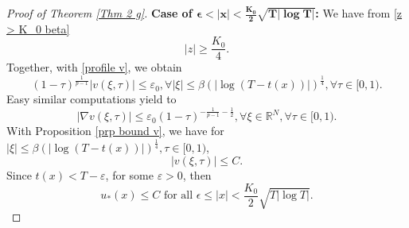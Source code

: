 \documentclass[11pt,a4paper]{article}
\newcommand{\1}{\mathbbm{1}}
\numberwithin{equation}{section}
\newcommand{\numberset}{\mathbb}
\newcommand{\R}{\numberset{R}}
\theoremstyle{remark}
\begin{document}
\begin{proof}[Proof of Theorem \ref{Thm 2 g}]
\textbf{Case of $\mathbf{\epsilon < |x|<\frac{K_0}{2}\sqrt{T|\log T|}}$:} We have from \eqref{z > K_0 beta}
$$|z|\geq \frac{K_0}{4}.$$
Together, with \eqref{profile v}, we obtain \begin{equation*}
(1-\tau)^{\frac{1}{p-1}}|v(\xi,\tau)|\leq \varepsilon_0, \forall |\xi|\leq\beta (|\log(T-t(x))|)^{\frac{1}{4}}, \forall \tau \in [0,1).
\end{equation*}
Easy similar computations yield to 
\begin{equation*}
|\nabla v(\xi,\tau)|\leq \varepsilon_0 (1-\tau)^{-\frac{1}{p-1}-\frac{1}{2}}, \forall \xi\in \R^N, \forall \tau \in [0,1).
\end{equation*}
With Proposition \ref{prp bound v}, we have for $|\xi|\leq\beta (|\log(T-t(x))|)^{\frac{1}{4}},\tau\in[0,1)$, 
$$|v(\xi,\tau)|\leq C.$$
Since $t(x)<T-\varepsilon$, for some $\varepsilon>0$, then 
\begin{equation}\label{control eta x>epsilon}
u_*(x)\leq C \text{ for all }\epsilon\leq |x|<\frac{K_0}{2}\sqrt{T|\log T|}.
\end{equation}


\end{proof}
\end{document}
